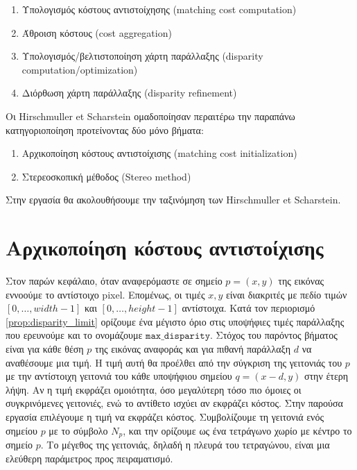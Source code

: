 \begin{enumerate}
	\item Υπολογισμός κόστους αντιστοίχησης \e (matching cost computation) \g
	\item Άθροιση κόστους \e (cost aggregation) \g
	\item Υπολογισμός/βελτιστοποίηση χάρτη παράλλαξης \e (disparity computation/optimization) \g
	\item Διόρθωση χάρτη παράλλαξης \e (disparity refinement) \g
\end{enumerate}

Οι \e Hirschmuller et Scharstein \g \citep{hirschmuller2007evaluation} ομαδοποίησαν περαιτέρω την παραπάνω κατηγοριοποίηση προτείνοντας δύο μόνο βήματα:

\begin{enumerate}
	\item Αρχικοποίηση κόστους αντιστοίχισης \e (matching cost initialization) \g
	\item Στερεοσκοπική μέθοδος \e (Stereo method) \g
\end{enumerate}

Στην εργασία θα ακολουθήσουμε την ταξινόμηση των \e Hirschmuller et Scharstein. \g


\section{Αρχικοποίηση κόστους αντιστοίχισης}

Στον παρών κεφάλαιο, όταν αναφερόμαστε σε σημείο $p=(x,y)$ της εικόνας εννοούμε το αντίστοιχο \e pixel. \g Επομένως, οι τιμές $x,y$ είναι διακριτές με πεδίο τιμών \e $[0,\ldots,width-1]$ \g και \e $[0,\ldots,height-1]$ \g αντίστοιχα. Κατά τον περιορισμό \ref{prop:disparity_limit} ορίζουμε ένα μέγιστο όριο στις υποψήφιες τιμές παράλλαξης που ερευνούμε και το ονομάζουμε $\mathtt{max\_disparity}$. Στόχος του παρόντος βήματος είναι για κάθε θέση $p$ της εικόνας αναφοράς και για πιθανή παράλλαξη $d$ να αναθέσουμε μια τιμή. Η τιμή αυτή θα προέλθει από την σύγκριση της γειτονιάς του $p$ με την αντίστοιχη γειτονιά του κάθε υποψήφιου σημείου $q = (x-d,y)$ στην έτερη λήψη. Αν η τιμή εκφράζει ομοιότητα, όσο μεγαλύτερη τόσο πιο όμοιες οι συγκρινόμενες γειτονιές, ενώ το αντίθετο ισχύει αν εκφράζει κόστος. Στην παρούσα εργασία επιλέγουμε η τιμή να εκφράζει κόστος. Συμβολίζουμε τη γειτονιά ενός σημείου $p$ με το σύμβολο $N_p$, και την ορίζουμε ως ένα τετράγωνο χωρίο με κέντρο το σημείο $p$. Το μέγεθος της γειτονιάς, δηλαδή η πλευρά του τετραγώνου, είναι μια ελεύθερη παράμετρος προς πειραματισμό.

